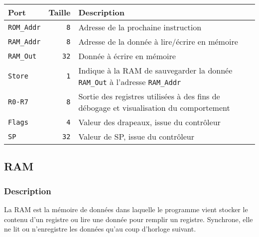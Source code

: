 \documentclass{article}
\begin{document}

    \begin{tabular}{|l|r|l|}
        \hline
        \textbf{Port}      & \textbf{Taille}     & \textbf{Description}                                                                       \\
        \hline

        \hline
        \texttt{ROM\_Addr} & \texttt{8}          & Adresse de la prochaine instruction                                                        \\
        \hline
        \texttt{RAM\_Addr} & \texttt{8}          & Adresse de la donnée à lire/écrire en mémoire                                              \\
        \hline
        \texttt{RAM\_Out}  & \texttt{32}         & Donnée à écrire en mémoire                                                                 \\
        \hline
        \texttt{Store}     & \texttt{1}          & Indique à la RAM de sauvegarder la donnée \texttt{RAM\_Out} à l'adresse \texttt{RAM\_Addr} \\
        \hline
        \texttt{R0-R7}     & \texttt{8\times 32} & Sortie des registres utilisées à des fins de débogage et visualisation du comportement     \\
        \texttt{Flags}   & \texttt{4}          & Valeur des drapeaux, issue du contrôleur                                                   \\
        \hline
        \texttt{SP}        & \texttt{32}         & Valeur de SP, issue du contrôleur                                                          \\

        \hline
    \end{tabular}

    \subsection{RAM}

    \subsubsection{Description}

    La RAM est la mémoire de données dans laquelle le programme vient stocker le contenu d'un registre ou lire une donnée pour remplir un registre.
    Synchrone, elle ne lit ou n'enregistre les données qu'au coup d'horloge suivant.
\end{document}
